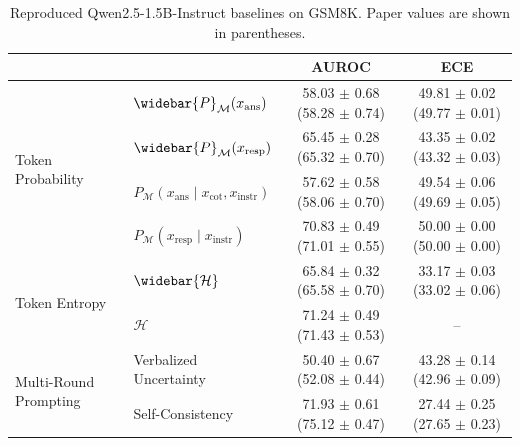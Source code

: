 \begin{table}[ht]
  \centering
  \caption{Reproduced Qwen2.5-1.5B-Instruct baselines on GSM8K. Paper values are shown in parentheses.}
  \begin{tabular}{llcc}
  \toprule
  & & AUROC & ECE \\
  \midrule
  \multirow{4}{*}{Token Probability}
  & $\widebar{P}_{\mathcal{M}}(x_{\mathrm{ans}})$ & 58.03 $\pm$ 0.68 (58.28 $\pm$ 0.74) & 49.81 $\pm$ 0.02 (49.77 $\pm$ 0.01) \\
  & $\widebar{P}_{\mathcal{M}}(x_{\mathrm{resp}})$ & 65.45 $\pm$ 0.28 (65.32 $\pm$ 0.70) & 43.35 $\pm$ 0.02 (43.32 $\pm$ 0.03) \\
  & $P_{\mathcal{M}}(x_{\mathrm{ans}}\mid x_{\mathrm{cot}},x_{\mathrm{instr}})$ & 57.62 $\pm$ 0.58 (58.06 $\pm$ 0.70) & 49.54 $\pm$ 0.06 (49.69 $\pm$ 0.05) \\
  & $P_{\mathcal{M}}(x_{\mathrm{resp}}\mid x_{\mathrm{instr}})$ & 70.83 $\pm$ 0.49 (71.01 $\pm$ 0.55) & 50.00 $\pm$ 0.00 (50.00 $\pm$ 0.00) \\
  \midrule
  \multirow{2}{*}{Token Entropy}
  & $\widebar{\mathcal{H}}$ & 65.84 $\pm$ 0.32 (65.58 $\pm$ 0.70) & 33.17 $\pm$ 0.03 (33.02 $\pm$ 0.06) \\
  & $\mathcal{H}$ & 71.24 $\pm$ 0.49 (71.43 $\pm$ 0.53) & -- \\
  \midrule
  \multirow{2}{*}{Multi-Round Prompting}
  & Verbalized Uncertainty & 50.40 $\pm$ 0.67 (52.08 $\pm$ 0.44) & 43.28 $\pm$ 0.14 (42.96 $\pm$ 0.09) \\
  & Self-Consistency & 71.93 $\pm$ 0.61 (75.12 $\pm$ 0.47) & 27.44 $\pm$ 0.25 (27.65 $\pm$ 0.23) \\
  \bottomrule
  \end{tabular}
\end{table}

